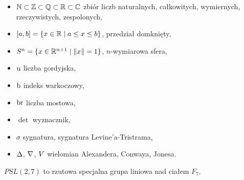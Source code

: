 
\begin{itemize}
    \item $\mathbb N \subset \mathbb Z \subset \mathbb Q \subset \mathbb R \subset \mathbb C$ zbiór liczb naturalnych, całkowitych, wymiernych, rzeczywistych, zespolonych,
    \item $[a, b] = \{x \in \mathbb R \mid a \le x \le b\}$, przedział domknięty,
    \item $S^n = \{x \in \mathbb R^{n+1} \mid \|x\| = 1\}$, $n$-wymiarowa sfera,
    \item $\operatorname{u}$ liczba gordyjska,
    \item $\operatorname{b}$ indeks warkoczowy,
    \item $\operatorname{br}$ liczba mostowa,
    \item $\det$ wyznacznik,
    \item $\sigma$ sygnatura, sygnatura Levine'a-Tristrama,
    \item $\Delta$, $\nabla$, $V$ wielomian Alexandera, Conwaya, Jonesa.
\end{itemize}

$PSL(2, 7)$ to rzutowa specjalna grupa liniowa nad ciałem $F_7$.



